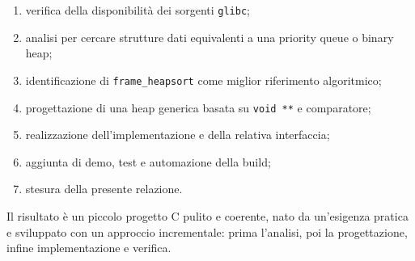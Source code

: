 \documentclass[a4paper,12pt]{article}
\begin{document}
\begin{enumerate}[leftmargin=*]
    \item verifica della disponibilità dei sorgenti \texttt{glibc};
    \item analisi per cercare strutture dati equivalenti a una priority queue o binary heap;
    \item identificazione di \texttt{frame\_heapsort} come miglior riferimento algoritmico;
    \item progettazione di una heap generica basata su \texttt{void **} e comparatore;
    \item realizzazione dell'implementazione e della relativa interfaccia;
    \item aggiunta di demo, test e automazione della build;
    \item stesura della presente relazione.
\end{enumerate}

Il risultato è un piccolo progetto C pulito e coerente, nato da un'esigenza pratica e sviluppato con un approccio incrementale: prima l'analisi, poi la progettazione, infine implementazione e verifica.
\end{document}
